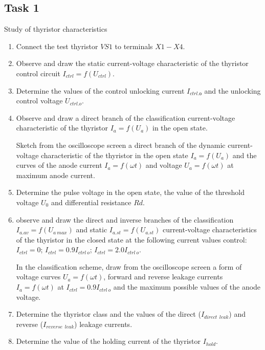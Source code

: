 \documentclass[a4paper,14pt]{article}
\begin{document}
\subsection{Task 1}

Study of thyristor characteristics

\begin{enumerate}
\item Connect the test thyristor $VS1$ to terminals $X1-X4$.
\item Observe and draw the static current-voltage characteristic of the thyristor control circuit 
$I_{ctrl} = f(U_{ctrl})$.
\item Determine the values of the control unlocking current $I_{ctrl.о}$ and the unlocking control voltage $U_{ctrl.o}$.
\item Observe and draw a direct branch of the classification current-voltage characteristic of the thyristor 
$I_a = f(U_a)$ in the open state.


Sketch from the oscilloscope screen a direct branch of the dynamic current-voltage characteristic of the thyristor
in the open state $I_a=f(U_a)$ and the curves of the anode current $I_a=f(\omega t)$ 
and voltage $U_a = f(\omega t)$ at maximum anode current.

\item Determine the pulse voltage in the open state, the value of the threshold voltage $U_0$
and differential resistance $Rd$.

\item observe and draw the direct and inverse branches of the classification 
$I_{a.av} = f (U_{a\: max})$ and static $I_{a.st} = f (U_{a.st})$
current-voltage characteristics of the thyristor in the closed state at the following current values
control: $I_{ctrl} = 0$; $I_{ctrl} = 0.9 I_{ctrl\:o}$; $I_{ctrl} = 2.0 I_{ctrl\:o}$.

In the classification scheme, draw from the oscilloscope screen
a form of voltage curves $U_a = f(\omega t)$, forward and reverse leakage currents $I_a = f(\omega t)$
at $I_{ctrl} = 0.9 I_{ctrl\:o}$ and the maximum possible values of the anode voltage.

\item Determine the thyristor class and the values of the direct ($I_{direct\:\:leak}$) and 
reverse ($I_{reverse\:\:leak}$) leakage currents.

\item Determine the value of the holding current of the thyristor $I_{hold}$.
\end{enumerate}
\end{document}

